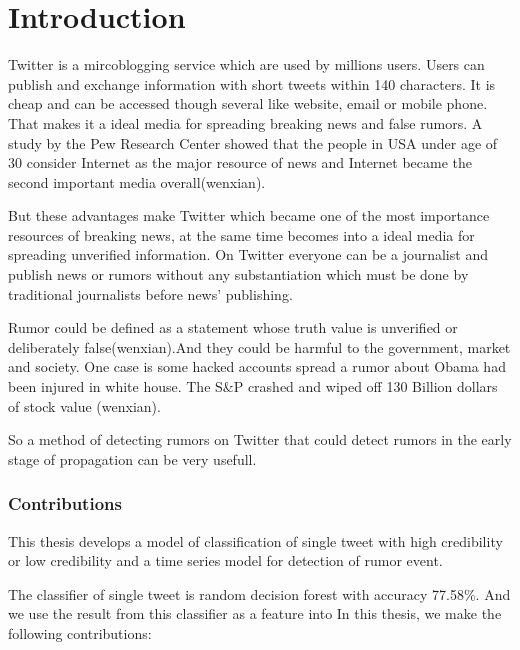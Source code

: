 \chapter{Introduction} %
\label{cha:introduction}
Twitter is a mircoblogging service which are used by millions users. Users can publish and exchange information with short tweets within 140 characters. It is cheap and can be accessed though several like website, email or mobile phone. That makes it a ideal media for spreading breaking news and false rumors.  A study by the Pew Research Center showed that the people in USA under age of 30 consider Internet as the major resource of news and Internet became the second important media overall(wenxian).

But these advantages make Twitter which became one of the most importance resources of breaking news, at the same time becomes into a ideal media for spreading unverified information. On Twitter everyone can be a journalist and publish news or rumors without any substantiation which must be done by traditional journalists before news' publishing. 

 Rumor could be defined as a statement whose truth value is unverified or deliberately false(wenxian).And they could be harmful to the government, market and society. One case is some hacked accounts spread a rumor about Obama had been injured in white house. The S\&P crashed and wiped off 130 Billion dollars of stock value (wenxian). 
 
 So a method of detecting rumors on Twitter that could detect rumors in the early stage of propagation can be very usefull.    

 
 \subsection{Contributions}
This thesis develops a model of classification of single tweet with high credibility or low credibility and a time series model for detection of rumor event.

The classifier of single tweet is random decision forest with accuracy 77.58\%. And we use the result from this classifier as a feature into 
 In this thesis, we make the following contributions:

